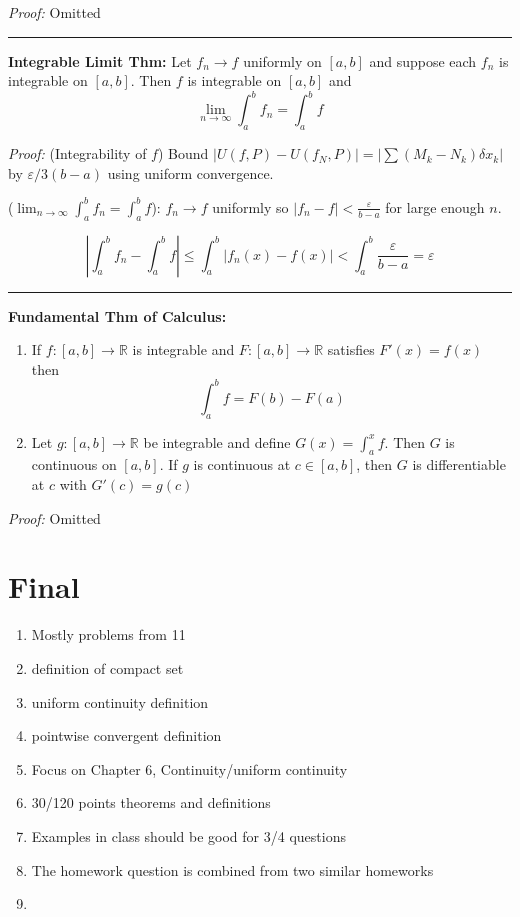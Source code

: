 \documentclass[12pt]{article}
\newcommand{\R}{\mathbb{R}}
\newcommand{\abs}[1]{\left\vert #1 \right\vert}
\newcommand{\ep}{\varepsilon}
\renewcommand{\hline}{\vspace*{10pt} \hrule \vspace*{10pt}}
\begin{document}
        \emph{Proof:} Omitted

    \hline

    \textbf{Integrable Limit Thm:} Let $f_n \to f$ uniformly on $[a, b]$ and suppose each $f_n$ is integrable on $[a, b]$. Then $f$ is integrable on $[a, b]$ and
    \[\lim_{n \to \infty} \int_a^b f_n = \int_a^b f\]

        \emph{Proof:} (Integrability of $f$) Bound $\abs{U(f, P) - U(f_N, P)} = \abs{\sum (M_k - N_k)\delta x_k}$ by $\ep/3(b-a)$ using uniform convergence. 

        ($\lim_{n \to \infty} \int_a^b f_n = \int_a^b f$): $f_n \to f$ uniformly so $\abs{f_n - f} < \frac{\ep}{b - a}$ for large enough $n$. 

        \[\abs{\int_a^b f_n - \int_a^b f} \leq \int_a^b \abs{f_n(x) - f(x)} < \int_a^b \frac{\ep}{b - a} = \ep\]

    \hline   

    \textbf{Fundamental Thm of Calculus:}
    \begin{enumerate}
        \item If $f: [a, b] \to \R$ is integrable and $F: [a, b] \to \R$ satisfies $F'(x) = f(x)$ then 
        \[\int_a^b f = F(b) - F(a)\]

        \item Let $g: [a, b] \to \R$ be integrable and define $G(x) = \int_a^x f$. Then $G$ is continuous on $[a, b]$. If $g$ is continuous at $c \in [a, b]$, then $G$ is differentiable at $c$ with $G'(c) = g(c)$
    \end{enumerate}

        \emph{Proof:} Omitted

\pagebreak


\section*{Final}
\begin{enumerate}
    \item Mostly problems from 11
    \item definition of compact set 
    \item uniform continuity definition
    \item pointwise convergent definition
    \item Focus on Chapter 6, Continuity/uniform continuity 
    \item 30/120 points theorems and definitions
    \item Examples in class should be good for 3/4 questions 
    \item The homework question is combined from two similar homeworks 
    \item 
\end{enumerate}
\end{document}
